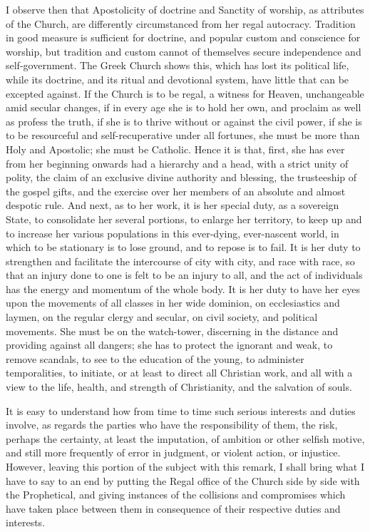 I observe then that Apostolicity of doctrine and Sanctity of
worship, as attributes of the Church, are differently circumstanced
from her regal autocracy. Tradition in good measure is sufficient for
doctrine, and popular custom and conscience for worship, but tradition
and custom cannot of themselves secure independence and
self-government. The Greek Church shows this, which has lost its
political life, while its doctrine, and its ritual and devotional
system, have little that can be excepted against. If the Church is to
be regal, a witness for Heaven, unchangeable amid secular changes, if
in every age she is to hold her own, and proclaim as well as profess
the truth, if she is to thrive without or against the civil power, if
she is to be resourceful and self-recuperative under all fortunes, she
must be more than Holy and Apostolic; she must be Catholic. Hence it
is that, first, she has ever from her beginning onwards had a
hierarchy and a head, with a strict unity of polity, the claim of an
exclusive divine authority and blessing, the trusteeship of the gospel
gifts, and the exercise over her members of an absolute and almost
despotic rule. And next, as to her work, it is her special duty, as a
sovereign State, to consolidate her several portions, to enlarge her
territory, to keep up and to increase her various populations
in this ever-dying, ever-nascent world, in which to be stationary is
to lose ground, and to repose is to fail. It is her duty to strengthen
and facilitate the intercourse of city with city, and race with race,
so that an injury done to one is felt to be an injury to all, and the
act of individuals has the energy and momentum of the whole body. It
is her duty to have her eyes upon the movements of all classes in her
wide dominion, on ecclesiastics and laymen, on the regular clergy and
secular, on civil society, and political movements. She must be on the
watch-tower, discerning in the distance and providing against all
dangers; she has to protect the ignorant and weak, to remove scandals,
to see to the education of the young, to administer temporalities, to
initiate, or at least to direct all Christian work, and all with a
view to the life, health, and strength of Christianity, and the
salvation of souls.

It is easy to understand how from time to time such serious
interests and duties involve, as regards the parties who have the
responsibility of them, the risk, perhaps the certainty, at least the
imputation, of ambition or other selfish motive, and still more
frequently of error in judgment, or violent action, or injustice.
However, leaving this portion of the subject with this remark, I shall
bring what I have to say to an end by putting the Regal office of the
Church side by side with the Prophetical, and giving instances of the collisions and compromises which have taken place
between them in consequence of their respective duties and interests.

